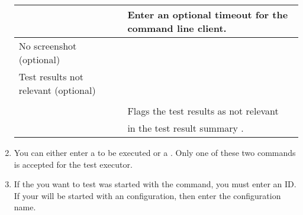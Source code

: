 \begin{enumerate}
\begin{supertabular}{|p{4.0cm}p{8.0cm}|}
		&Enter an optional timeout for the command line client.\\
                \hline
		No screenshot (optional)
                  & \\
                  \hline
		Test results not relevant (optional)
                  & \\
                  &\\
		&Flags the test results as not relevant \\
                & in the test result summary .\\
		\hline
\end{supertabular}


\item You can either enter a \gdsuite{} to be executed or a \gdjob{}. Only one of these two commands is accepted for the test executor. 
\item If the \gdaut{} you want to test was started with the  command, you must enter an \gdaut{} ID. If your \gdaut{} will be started with an \gdaut{} configuration, then enter the configuration name. 


\end{enumerate}
